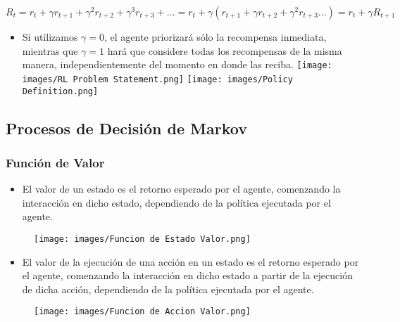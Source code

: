 \documentclass[11pt]{article}
\makeatletter
\def\maxwidth{\ifdim\Gin@nat@width>\linewidth\linewidth
    \else\Gin@nat@width\fi}
\let\Oldincludegraphics\includegraphics
\renewcommand{\includegraphics}[1]{\Oldincludegraphics[width=.8\maxwidth]{#1}}
\providecommand{\tightlist}{%
      \setlength{\itemsep}{0pt}\setlength{\parskip}{0pt}}
\makeatother
\begin{document}
\begin{equation} R_{t} = r_{t} + γr_{t+1} + γ^2r_{t+2} + γ^3r_{t+3} + ... = r_{t} + γ(r_{t+1} + γr_{t+2} + γ^2r_{t+3} ...) = r_{t} + γR_{t+1} \end{equation}

\begin{itemize}
\tightlist
\item
  Si utilizamos \(γ=0\), el agente priorizará sólo la recompensa
  inmediata, mientras que \(\gamma=1\) hará que considere todas los
  recompensas de la misma manera, independientemente del momento en
  donde las reciba. \texttt{[image: images/RL Problem Statement.png]}
  \texttt{[image: images/Policy Definition.png]}
\end{itemize}

    \subsection{Procesos de Decisión de
Markov}\label{procesos-de-decisiuxf3n-de-markov}

\subsubsection{Función de Valor}\label{funciuxf3n-de-valor}

\begin{itemize}
\tightlist
\item
  El valor de un estado es el retorno esperado por el agente, comenzando
  la interacción en dicho estado, dependiendo de la política ejecutada
  por el agente.
\end{itemize}

\begin{figure}
\centering
\texttt{[image: images/Funcion de Estado Valor.png]}
\caption{}
\end{figure}

\begin{itemize}
\tightlist
\item
  El valor de la ejecución de una acción en un estado es el retorno
  esperado por el agente, comenzando la interacción en dicho estado a
  partir de la ejecución de dicha acción, dependiendo de la política
  ejecutada por el agente.
\end{itemize}

\begin{figure}
\centering
\texttt{[image: images/Funcion de Accion Valor.png]}
\caption{}
\end{figure}
\end{document}
